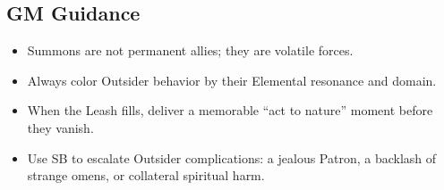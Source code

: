 \subsection{GM Guidance}
\begin{itemize}
  \item Summons are not permanent allies; they are volatile forces.
  \item Always color Outsider behavior by their Elemental resonance and domain.
  \item When the Leash fills, deliver a memorable ``act to nature'' moment before they vanish.
  \item Use SB to escalate Outsider complications: a jealous Patron, a backlash of strange omens, or collateral spiritual harm.
\end{itemize}
